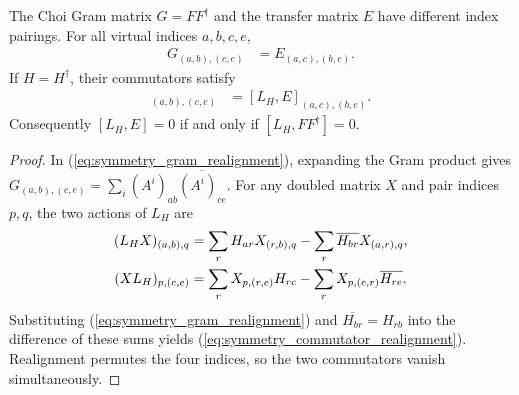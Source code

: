 \begin{lemma}
    \label{thm:row_transfer_gram_realignment}
    \leanok
    The Choi Gram matrix $G=FF^\dagger$ and the transfer matrix $E$ have
    different index pairings. For all virtual indices $a,b,c,e$,
    \begin{align}
        G_{(a,b),(c,e)} & =E_{(a,c),(b,e)}.
        \label{eq:symmetry_gram_realignment}
    \end{align}
    If $H=H^\dagger$, their commutators satisfy
    \begin{align}
        [L_H,G]_{(a,b),(c,e)} & =[L_H,E]_{(a,c),(b,e)}.
        \label{eq:symmetry_commutator_realignment}
    \end{align}
    Consequently $[L_H,E]=0$ if and only if $[L_H,FF^\dagger]=0$.
\end{lemma}
\begin{proof}\leanok
    In (\ref{eq:symmetry_gram_realignment}), expanding the Gram product gives
    $G_{(a,b),(c,e)}=\sum_i(A^i)_{ab}\overline{(A^i)_{ce}}$.
    For any doubled matrix $X$ and pair indices $p,q$, the two actions of
    $L_H$ are
    \begin{align}
        (L_HX)_{(a,b),q}
         & =\sum_r H_{ar}X_{(r,b),q}
        -\sum_r\overline{H_{br}}X_{(a,r),q},\notag \\
        (XL_H)_{p,(c,e)}
         & =\sum_r X_{p,(r,e)}H_{rc}
        -\sum_r X_{p,(c,r)}\overline{H_{re}}.
        \notag
    \end{align}
    Substituting (\ref{eq:symmetry_gram_realignment}) and
    $\overline{H_{br}}=H_{rb}$ into the difference of these sums yields
    (\ref{eq:symmetry_commutator_realignment}). Realignment permutes the
    four indices, so the two commutators vanish simultaneously.
\end{proof}

